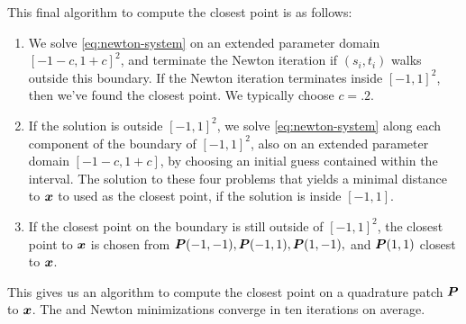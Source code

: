 This final algorithm to compute the closest point is as follows:
\begin{enumerate}
  \item We solve \cref{eq:newton-system} on an extended parameter domain $[-1-c, 1+c]^2$, and terminate the Newton iteration if $(s_i,t_i)$ walks outside this boundary. 
    If the Newton iteration terminates inside $[-1,1]^2$, then we've found the closest point.
    We typically choose $c = .2$.
  \item  If the solution is outside $[-1,1]^2$, we solve \cref{eq:newton-system} along each component of the boundary of $[-1,1]^2$, also on an extended parameter domain $[-1-c,1+c]$,
    by choosing an initial guess contained within the interval.
    The solution to these four problems that yields a minimal distance to ${\bm{x}}$ to used as the closest point, if the solution is inside $[-1,1]$.
  \item If the closest point on the boundary is still outside of $[-1,1]^2$, the
      closest point to ${\bm{x}}$ is chosen from ${\bm{P}}(-1,-1), {\bm{P}}(-1,1), {\bm{P}}(1,-1),$ and ${\bm{P}}(1,1)$ closest to ${\bm{x}}$.
\end{enumerate}
This gives us an algorithm to compute the closest point on a quadrature patch ${\bm{P}}$ to ${\bm{x}}$.
The \oned and \twod Newton minimizations converge in ten iterations on average.
